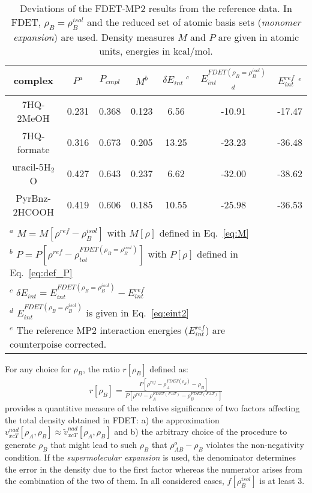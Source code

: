 \documentclass[journal=jctcce,manuscript=article]{achemso}
\newcommand{\nr}[1]{\color{red}#1\color{black}}
\begin{document}
\begin{table*}
{
\begin{center}
\begin{tabular}{|c|c|c|c|c|c|c|}
\hline
 complex & $P^a$ & $P_{cmpl}$ & $M^b$ & $\delta E_{int}\;^c$&$E^{FDET(\rho_B=\rho_B^{isol})}_{int}$ $^d$&$E_{int}^{ref}$ $^e$ \\ \hline
7HQ-2MeOH & 0.231 & 0.368 & 0.123 & 6.56 & -10.91 & -17.47 \\ \hline
7HQ-formate & 0.316 & 0.673 & 0.205 & 13.25 & -23.23 & -36.48 \\ \hline
uracil-5H$_2$O & 0.427 & 0.643 & 0.237 & 6.62 & -32.00 & -38.62 \\ \hline
PyrBnz-2HCOOH & 0.419 & 0.606 & 0.185 & 10.55 & -25.98 &  -36.53 \\ \hline
\multicolumn{6}{c}{ } \\
\multicolumn{6}{l}{$^a$ $M=M[\rho^{ref} - \rho^{isol}_{B}]$ with $M[\rho]$ defined in Eq.~\ref{eq:M}}\\
\multicolumn{6}{l}{$^b$ $P=P[\rho^{ref} - \rho_{tot}^{FDET(\rho_B=\rho_B^{isol})}]$ with $P[\rho]$ defined in Eq.~\ref{eq:def_P}}\\
\multicolumn{6}{l}{$^c$ $\delta E_{int}=E^{FDET(\rho_B=\rho_B^{isol})}_{int}-E_{int}^{ref}$} \\
\multicolumn{6}{l}{$^d$ $E^{FDET(\rho_B=\rho_B^{isol})}_{int}$ is given in Eq.~\ref{eq:eint2}}\\
\multicolumn{6}{l}{$^e$ The reference MP2 interaction energies ($E_{int}^{ref}$) are \nr{counterpoise } corrected.}
\end{tabular}
\end{center}
}%
\caption{Deviations of the FDET-MP2 results from the reference data.  In FDET, $\rho_B=\rho_B^{isol}$  and the reduced set of atomic basis sets ({\it monomer expansion}) are used. 
Density measures $M$ and $P$ are given in atomic units, energies in kcal/mol.
}
\label{table:ME_isol}
\end{table*}

For any choice for $\rho_B$,
the ratio \nr{$r[\rho_B]$ } defined as:
\begin{eqnarray}
r[\rho_B]=\frac{P[\rho^{ref} - \rho_{A}^{FDET(\rho_{B})}-\rho_{B}]}{P[\rho^{ref} - \rho_{A}^{FDET(FAT)}-\rho_{B}^{FDET(FAT)}]}
\end{eqnarray}
provides a quantitive measure of the relative significance of two factors affecting the total density obtained in FDET:
a) the approximation $v_{xcT}^{nad}[\rho_A,\rho_B]\approx \tilde{v}_{xcT}^{nad}[\rho_A,\rho_B]$  and b) the arbitrary choice of the procedure to generate $\rho_B$ that might lead to such $\rho_B$ that  
\nr{$\rho_{AB}^o-\rho_B$ }violates the non-negativity condition.
If the {\it supermolecular expansion} is used, the denominator determines the error in the density due to the first factor whereas the numerator arises from the combination of the two of them.
In all considered cases,  $f[\rho_B^{isol}]$ is at least 3.
\end{document}
